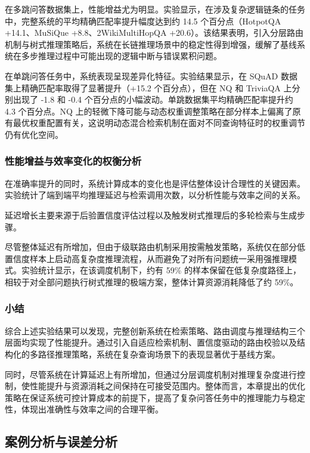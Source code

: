 在多跳问答数据集上，性能增益尤为明显。实验显示，在涉及复杂逻辑链条的任务中，完整系统的平均精确匹配率提升幅度达到约 14.5 个百分点（HotpotQA +14.1、MuSiQue +8.8、2WikiMultiHopQA +20.6）。该结果表明，引入分层路由机制与树式推理策略后，系统在长链推理场景中的稳定性得到增强，缓解了基线系统在多步推理过程中可能出现的逻辑中断与错误累积问题。

在单跳问答任务中，系统表现呈现差异化特征。实验结果显示，在 SQuAD 数据集上精确匹配率取得了显著提升（+15.2 个百分点），但在 NQ 和 TriviaQA 上分别出现了 -1.8 和 -0.4 个百分点的小幅波动。单跳数据集平均精确匹配率提升约 4.3 个百分点。NQ 上的轻微下降可能与动态权重调整策略在部分样本上偏离了原有最优权重配置有关，这说明动态混合检索机制在面对不同查询特征时的权重调节仍有优化空间。


\subsubsection{性能增益与效率变化的权衡分析}

在准确率提升的同时，系统计算成本的变化也是评估整体设计合理性的关键因素。实验统计了端到端平均推理延迟与检索调用次数，以分析性能与效率之间的关系。

延迟增长主要来源于后验置信度评估过程以及触发树式推理后的多轮检索与生成步骤。

尽管整体延迟有所增加，但由于级联路由机制采用按需触发策略，系统仅在部分低置信度样本上启动高复杂度推理流程，从而避免了对所有问题统一采用强推理模式。实验统计显示，在该调度机制下，约有 59\% 的样本保留在低复杂度路径上，相较于对全部问题执行树式推理的极端方案，整体计算资源消耗降低了约 59\%。

\subsubsection{小结}

综合上述实验结果可以发现，完整创新系统在检索策略、路由调度与推理结构三个层面均实现了性能提升。通过引入自适应检索机制、置信度驱动的路由校验以及结构化的多路径推理策略，系统在复杂查询场景下的表现显著优于基线方案。

同时，尽管系统在计算延迟上有所增加，但通过分层调度机制对推理复杂度进行控制，使性能提升与资源消耗之间保持在可接受范围内。整体而言，本章提出的优化策略在保证系统可控计算成本的前提下，提高了复杂问答任务中的推理能力与稳定性，体现出准确性与效率之间的合理平衡。

\subsection{案例分析与误差分析}

